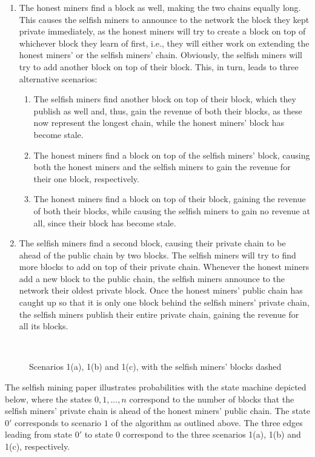 \begin{enumerate}
	\item 
		The honest miners find a block as well, making the two chains equally long.
		This causes the selfish miners to announce to the network the block they kept private immediately, as the honest miners will try to create a block on top of whichever block they learn of first, i.e., they will either work on extending the honest miners’ or the selfish miners’ chain.
		Obviously, the selfish miners will try to add another block on top of their block.
		This, in turn, leads to three alternative scenarios:
		\begin{enumerate}
			\item
				The selfish miners find another block on top of their block, which they publish as well and, thus, gain the revenue of both their blocks, as these now represent the longest chain, while the honest miners' block has become stale.
			\item
				The honest miners find a block on top of the selfish miners' block, causing both the honest miners and the selfish miners to gain the revenue for their one block, respectively.
			\item
				The honest miners find a block on top of their block, gaining the revenue of both their blocks, while causing the selfish miners to gain no revenue at all, since their block has become stale.
		\end{enumerate}
	\item
		The selfish miners find a second block, causing their private chain to be ahead of the public chain by two blocks.
		The selfish miners will try to find more blocks to add on top of their private chain.
		Whenever the honest miners add a new block to the public chain, the selfish miners announce to the network their oldest private block.
		Once the honest miners’ public chain has caught up so that it is only one block behind the selfish miners' private chain, the selfish miners publish their entire private chain, gaining the revenue for all its blocks.
\end{enumerate}
\leavevmode\\
\begin{figure}[H]
	\centering
	
	\caption*{Scenarios 1(a), 1(b) and 1(c), with the selfish miners' blocks dashed}
\end{figure}

The selfish mining paper illustrates probabilities with the state machine depicted below, where the states $0, 1, ..., n$ correspond to the number of blocks that the selfish miners' private chain is ahead of the honest miners' public chain.
The state $0'$ corresponds to scenario $1$ of the algorithm as outlined above.
The three edges leading from state $0'$ to state $0$ correspond to the three scenarios 1(a), 1(b) and 1(c), respectively.

